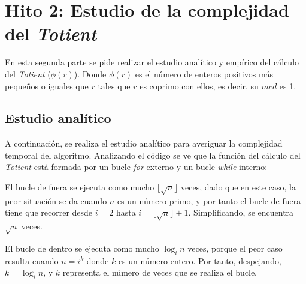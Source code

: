 \documentclass{uc3mpracticas}
\begin{document}
  \frontmatter



  \vspace{55mm}


  \newpage

  \tableofcontents

  \newpage

  \mainmatter

  \section{Hito 2: Estudio de la complejidad del \textit{Totient}}

  En esta segunda parte se pide realizar el estudio analítico y empírico del cálculo del \textit{Totient} ($\phi(r)$). Donde $\phi(r)$ es el número de enteros positivos más pequeños o iguales que $r$ tales que $r$ es coprimo con ellos, es decir, su $mcd$ es 1.



  \subsection{Estudio analítico}

  A continuación, se realiza el estudio analítico para averiguar la complejidad temporal del algoritmo. Analizando el código se ve que la función del cálculo del \textit{Totient} está formada por un bucle \textit{for} externo y un bucle \textit{while} interno:

  \vspace{2mm}

  El bucle de fuera se ejecuta como mucho $\lfloor \sqrt{n} \rfloor$ veces, dado que en este caso, la peor situación se da cuando $n$ es un número primo, y por tanto el bucle de fuera tiene que recorrer desde $i = 2$ hasta $i = \lfloor \sqrt{n} \rfloor + 1$. Simplificando, se encuentra $\sqrt{n}$ veces.

  \vspace{2mm}

  El bucle de dentro se ejecuta como mucho $\log_i{n}$ veces, porque el peor caso resulta cuando $ n = i^k $ donde $ k $ es un número entero. Por tanto, despejando, $k = \log_in$, y $k$ representa el número de veces que se realiza el bucle.
\end{document}
